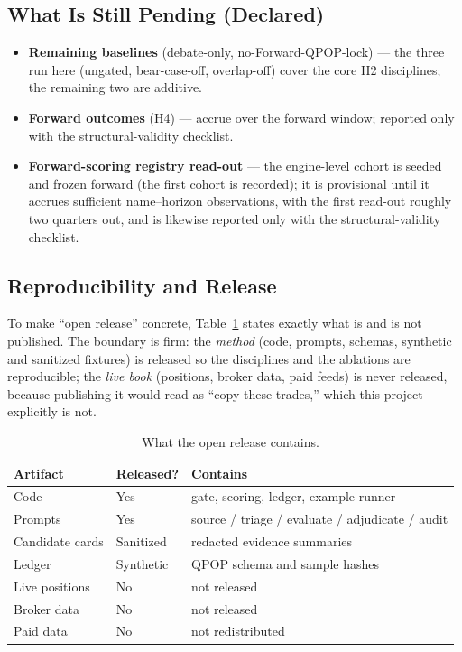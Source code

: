 \documentclass[11pt]{article}
\begin{document}
\subsection{What Is Still Pending (Declared)}

\begin{itemize}
  \item \textbf{Remaining baselines} (debate-only, no-Forward-QPOP-lock) ---
    the three run here (ungated, bear-case-off, overlap-off) cover the core H2
    disciplines; the remaining two are additive.
  \item \textbf{Forward outcomes} (H4) --- accrue over the forward window;
    reported only with the structural-validity checklist.
  \item \textbf{Forward-scoring registry read-out} --- the engine-level cohort is
    seeded and frozen forward (the first cohort is recorded); it is provisional until it
    accrues sufficient name--horizon observations, with the first read-out roughly two
    quarters out, and is likewise reported only with the structural-validity checklist.
\end{itemize}

\subsection{Reproducibility and Release}

To make ``open release'' concrete, Table~\ref{tab:release} states exactly what is
and is not published. The boundary is firm: the \emph{method} (code, prompts,
schemas, synthetic and sanitized fixtures) is released so the disciplines and the
ablations are reproducible; the \emph{live book} (positions, broker data, paid
feeds) is never released, because publishing it would read as ``copy these
trades,'' which this project explicitly is not.

\begin{table}[H]
\centering
\begin{tabular}{lll}
\toprule
\textbf{Artifact} & \textbf{Released?} & \textbf{Contains} \\
\midrule
Code            & Yes                        & gate, scoring, ledger, example runner \\
Prompts         & Yes                        & source / triage / evaluate / adjudicate / audit \\
Candidate cards & Sanitized                  & redacted evidence summaries \\
Ledger          & Synthetic                  & QPOP schema and sample hashes \\
Live positions  & No                         & not released \\
Broker data     & No                         & not released \\
Paid data       & No                         & not redistributed \\
\bottomrule
\end{tabular}
\caption{What the open release contains.}
\label{tab:release}
\end{table}
\end{document}

